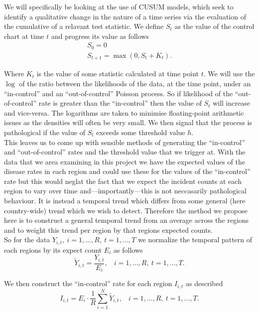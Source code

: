\documentclass{report}
\begin{document}
We will specifically be looking at the use of CUSUM models, which seek to identify a qualitative change in the nature of a time series via the evaluation of the cumulative of a relavant test statistic. We define $S_t$ as the value of the control chart at time $t$ and progress its value as follows
\begin{gather}
S_0 = 0 \\
S_{t+1} = \max{(0, S_t + K_t)}.
\end{gather}

Where $K_t$ is the value of some statistic calculated at time point $t$. We will use the $\log$ of the ratio between the likelihoods of the data, at the time point, under an ``in-control'' and an ``out-of-control'' Poisson process. So if likelihood of the ``out-of-control'' rate is greater than the ``in-control'' then the value of $S_t$ will increase and vice-versa. The logarithms are taken to minimise floating-point arithmetic issues as the densities will often be very small. We then signal that the process is pathological if the value of $S_t$ exceeds some threshold value $h$. \\

This leaves us to come up with sensible methods of generating the ``in-control'' and ``out-of-control'' rates and the threshold value that we trigger at. With the data that we area examining in this project we have the expected values of the disease rates in each region and could use these for the values of the ``in-control'' rate but this would neglat the fact that we expect the incident counts at each region to vary over time and---importantly---this is not neccasarily pathological behaviour. It is instead a temporal trend which differs from some general (here country-wide) trend which we wish to detect. Therefore the method we propose here is to construct a general temporal trend from an average across the regions and to weight this trend per region by that regions expected counts. \\

So for the data $Y_{i,t}, \ i = 1, \ldots, R, \ t = 1, \ldots, T$ we normalize the temporal pattern of each regions by its expect count $E_{i}$ as follows
\begin{equation}
\tilde{Y}_{i, t} = \frac{Y_{i, t}}{E_{i}}, \ \ \ \ i = 1, \ldots, R, \ t = 1, \ldots, T.
\end{equation} 

We then construct the ``in-control'' rate for each region $I_{i, t}$ as described
\begin{equation}
I_{i, t} = E_i \cdot \frac{1}{R} \sum_{i=1}^N \tilde{Y}_{i, t}, \ \ \ \ i = 1, \ldots, R, \ t = 1, \ldots, T.
\end{equation}
\end{document}
